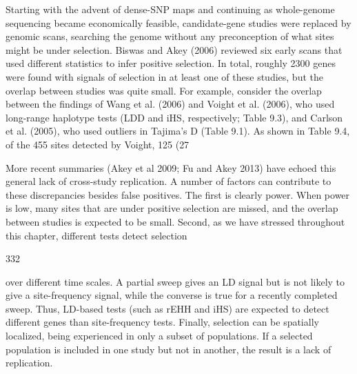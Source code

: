 \documentclass{article}
\begin{document}
Starting with the advent of dense-SNP maps and continuing as whole-genome sequencing became economically feasible, candidate-gene studies were replaced by genomic scans, searching the genome without any preconception of what sites might be under selection. Biswas and Akey (2006) reviewed six early scans that used different statistics to infer positive selection. In total, roughly 2300 genes were found with signals of selection in at least one of these studies, but the overlap between studies was quite small. For example, consider the overlap between the findings of Wang et al. (2006) and Voight et al. (2006), who used long-range haplotype tests (LDD and iHS, respectively; Table 9.3), and Carlson et al. (2005), who used outliers in Tajima's D (Table 9.1). As shown in Table 9.4, of the 455 sites detected by Voight, 125 (27%

More recent summaries (Akey et al 2009; Fu and Akey 2013) have echoed this general lack of cross-study replication. A number of factors can contribute to these discrepancies besides false positives. The first is clearly power. When power is low, many sites that are under positive selection are missed, and the overlap between studies is expected to be small. Second, as we have stressed throughout this chapter, different tests detect selection

332

over different time scales. A partial sweep gives an LD signal but is not likely to give a site-frequency signal, while the converse is true for a recently completed sweep. Thus, LD-based tests (such as rEHH and iHS) are expected to detect different genes than site-frequency tests. Finally, selection can be spatially localized, being experienced in only a subset of populations. If a selected population is included in one study but not in another, the result is a lack of replication.
\end{document}
